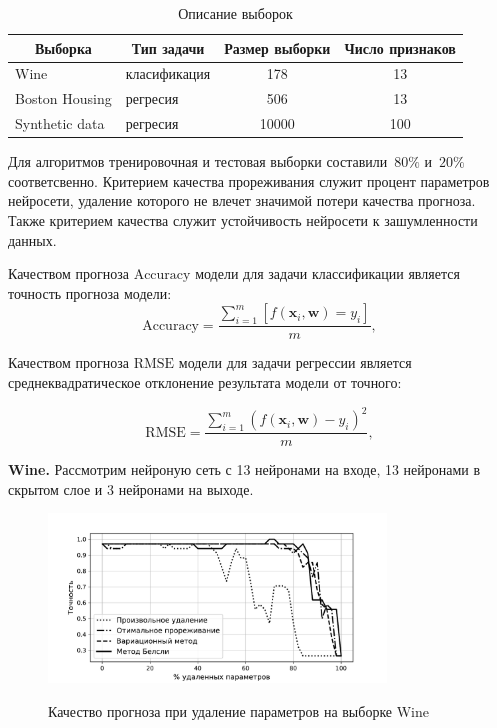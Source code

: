 \begin{table}[h]

\begin{center}
\caption{Описание выборок}
\begin{tabular}{|c|c|c|c|}
\hline
	Выборка &Тип задачи& Размер выборки& Число признаков\\
	\hline
	
	\multicolumn{1}{|l|}{Wine}
	&
	\multicolumn{1}{|l|}{класификация}
	 & 178 & 13\\
	\hline
	
	\multicolumn{1}{|l|}{Boston Housing}
	&
	\multicolumn{1}{|l|}{регресия}
	& 506 & 13\\
	\hline
	
	\multicolumn{1}{|l|}{Synthetic data}
	&
	\multicolumn{1}{|l|}{регресия}
	& 10000 & 100\\
\hline

\end{tabular}
\end{center}
\end{table}



Для алгоритмов тренировочная и тестовая выборки составили~$80\%$ и~$20\%$ соответсвенно. Критерием качества прореживания служит процент параметров нейросети, удаление которого не влечет значимой потери качества прогноза. Также критерием качества служит устойчивость нейросети к зашумленности данных. 

Качеством прогноза $\text{Accuracy}$ модели для задачи классификации является точность прогноза модели:
$$\text{Accuracy} = \frac{\sum_{i=1}^m [f(\textbf{x}_i, \textbf{w}) = y_i]}{m},$$

Качеством прогноза $\text{RMSE}$ модели для задачи регрессии является среднеквадратическое отклонение результата модели от точного:

$$\text{RMSE} = \frac{\sum_{i=1}^m \left(f(\textbf{x}_i, \textbf{w}) - y_i\right)^2}{m},$$

\textbf{Wine.} Рассмотрим нейроную сеть с 13 нейронами на входе, 13 нейронами в скрытом слое и 3 нейронами на выходе.

\begin{figure}[h!t]\center
\includegraphics[width=0.8\textwidth]{plots/grabovoy/Wine/All.pdf}\\
\caption{Качество прогноза при удаление параметров на выборке Wine}
\label{WineAll}
\end{figure}

